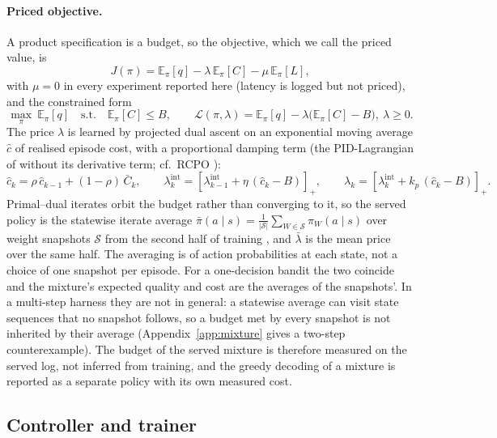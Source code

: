 \documentclass[10pt]{article}
\newcommand{\E}{\mathbb{E}}
\newcommand{\pos}[1]{\left[#1\right]_{+}}
\begin{document}
\paragraph{Priced objective.} A product specification is a budget, so the objective, which we call the priced value, is
\begin{equation}
J(\pi)=\E_\pi[q]-\lambda\,\E_\pi[C]-\mu\,\E_\pi[L],
\label{eq:J}
\end{equation}
with $\mu=0$ in every experiment reported here (latency is logged but not priced), and the constrained form
\begin{equation}
\max_\pi\ \E_\pi[q]\quad\text{s.t.}\quad \E_\pi[C]\le B,
\qquad
\mathcal{L}(\pi,\lambda)=\E_\pi[q]-\lambda\big(\E_\pi[C]-B\big),\ \lambda\ge0 .
\label{eq:lagrangian}
\end{equation}
The price $\lambda$ is learned by projected dual ascent on an exponential moving average $\hat c$ of realised episode cost, with a proportional damping term (the PID-Lagrangian of \citet{stooke2020pid} without its derivative term; cf.\ RCPO \citep{tessler2018rcpo}):
\begin{equation}
\hat c_k=\rho\,\hat c_{k-1}+(1-\rho)\,\bar C_k,\qquad
\lambda^{\mathrm{int}}_k=\pos{\lambda^{\mathrm{int}}_{k-1}+\eta\,(\hat c_k-B)},\qquad
\lambda_k=\pos{\lambda^{\mathrm{int}}_k+k_p\,(\hat c_k-B)} .
\label{eq:dual}
\end{equation}
Primal--dual iterates orbit the budget rather than converging to it, so the served policy is the statewise iterate average $\bar\pi(a\mid s)=\frac{1}{|\mathcal{S}|}\sum_{W\in\mathcal{S}}\pi_W(a\mid s)$ over weight snapshots $\mathcal{S}$ from the second half of training \citep{nedic2009saddle}, and $\bar\lambda$ is the mean price over the same half. The averaging is of action probabilities at each state, not a choice of one snapshot per episode. For a one-decision bandit the two coincide and the mixture's expected quality and cost are the averages of the snapshots'. In a multi-step harness they are not in general: a statewise average can visit state sequences that no snapshot follows, so a budget met by every snapshot is not inherited by their average (Appendix~\ref{app:mixture} gives a two-step counterexample). The budget of the served mixture is therefore measured on the served log, not inferred from training, and the greedy decoding of a mixture is reported as a separate policy with its own measured cost.

\subsection{Controller and trainer}
\label{sec:controller}
\end{document}
